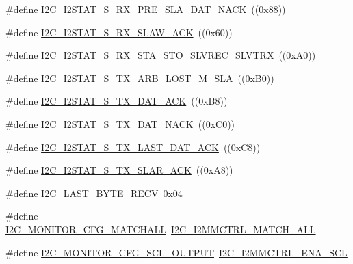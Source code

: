 \begin{DoxyCompactItemize}
\item 
\#define \hyperlink{group__I2C__17XX__40XX_gace56a90d55426cc6ab2a4ca540c63d02}{I2\+C\+\_\+\+I2\+S\+T\+A\+T\+\_\+\+S\+\_\+\+R\+X\+\_\+\+P\+R\+E\+\_\+\+S\+L\+A\+\_\+\+D\+A\+T\+\_\+\+N\+A\+CK}~((0x88))
\item 
\#define \hyperlink{group__I2C__17XX__40XX_ga7055c4b55feda352df8016cbca0c270b}{I2\+C\+\_\+\+I2\+S\+T\+A\+T\+\_\+\+S\+\_\+\+R\+X\+\_\+\+S\+L\+A\+W\+\_\+\+A\+CK}~((0x60))
\item 
\#define \hyperlink{group__I2C__17XX__40XX_ga7afe9f0e54aeb9ce8428c0adeb3c3274}{I2\+C\+\_\+\+I2\+S\+T\+A\+T\+\_\+\+S\+\_\+\+R\+X\+\_\+\+S\+T\+A\+\_\+\+S\+T\+O\+\_\+\+S\+L\+V\+R\+E\+C\+\_\+\+S\+L\+V\+T\+RX}~((0x\+A0))
\item 
\#define \hyperlink{group__I2C__17XX__40XX_gac71ac23a80e1bdb700a2c37170031107}{I2\+C\+\_\+\+I2\+S\+T\+A\+T\+\_\+\+S\+\_\+\+T\+X\+\_\+\+A\+R\+B\+\_\+\+L\+O\+S\+T\+\_\+\+M\+\_\+\+S\+LA}~((0x\+B0))
\item 
\#define \hyperlink{group__I2C__17XX__40XX_gaeb92fe85cc3f6c813cb91685234ac08c}{I2\+C\+\_\+\+I2\+S\+T\+A\+T\+\_\+\+S\+\_\+\+T\+X\+\_\+\+D\+A\+T\+\_\+\+A\+CK}~((0x\+B8))
\item 
\#define \hyperlink{group__I2C__17XX__40XX_gad9cdcd8c06924252a2ad9baced97d838}{I2\+C\+\_\+\+I2\+S\+T\+A\+T\+\_\+\+S\+\_\+\+T\+X\+\_\+\+D\+A\+T\+\_\+\+N\+A\+CK}~((0x\+C0))
\item 
\#define \hyperlink{group__I2C__17XX__40XX_ga3e4522387958da1da6017a6e48a0daad}{I2\+C\+\_\+\+I2\+S\+T\+A\+T\+\_\+\+S\+\_\+\+T\+X\+\_\+\+L\+A\+S\+T\+\_\+\+D\+A\+T\+\_\+\+A\+CK}~((0x\+C8))
\item 
\#define \hyperlink{group__I2C__17XX__40XX_gae6dcbdd1f01f7ebf3595722770e3b7b6}{I2\+C\+\_\+\+I2\+S\+T\+A\+T\+\_\+\+S\+\_\+\+T\+X\+\_\+\+S\+L\+A\+R\+\_\+\+A\+CK}~((0x\+A8))
\item 
\#define \hyperlink{group__I2C__17XX__40XX_gadbb787dfeda35fe21147da81f68c0b57}{I2\+C\+\_\+\+L\+A\+S\+T\+\_\+\+B\+Y\+T\+E\+\_\+\+R\+E\+CV}~0x04
\item 
\#define \hyperlink{group__I2C__17XX__40XX_gadd2b30f5b29839a83c893d88b8d09dd7}{I2\+C\+\_\+\+M\+O\+N\+I\+T\+O\+R\+\_\+\+C\+F\+G\+\_\+\+M\+A\+T\+C\+H\+A\+LL}~\hyperlink{group__I2C__17XX__40XX_gac7dd5efba503dd79c6b42f3575f70307}{I2\+C\+\_\+\+I2\+M\+M\+C\+T\+R\+L\+\_\+\+M\+A\+T\+C\+H\+\_\+\+A\+LL}
\item 
\#define \hyperlink{group__I2C__17XX__40XX_ga5f79529ae357b8aa86e6ead24d95167e}{I2\+C\+\_\+\+M\+O\+N\+I\+T\+O\+R\+\_\+\+C\+F\+G\+\_\+\+S\+C\+L\+\_\+\+O\+U\+T\+P\+UT}~\hyperlink{group__I2C__17XX__40XX_gabf11567c27c48d795ba0f92cf636dab6}{I2\+C\+\_\+\+I2\+M\+M\+C\+T\+R\+L\+\_\+\+E\+N\+A\+\_\+\+S\+CL}

\end{DoxyCompactItemize}
